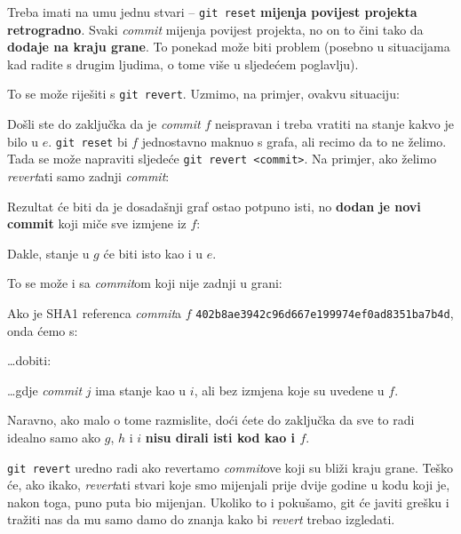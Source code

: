 Treba imati na umu jednu stvari -- \verb+git reset+ \textbf{mijenja povijest projekta retrogradno}.
Svaki \emph{commit} mijenja povijest projekta, no on to čini tako da \textbf{dodaje na kraju grane}.
To ponekad može biti problem (posebno u situacijama kad radite s drugim ljudima, o tome više u sljedećem poglavlju).

To se može riješiti s \verb+git revert+. Uzmimo, na primjer, ovakvu situaciju:



Došli ste do zaključka da je \emph{commit} $f$ neispravan i treba vratiti na stanje kakvo je bilo u $e$.
\verb+git reset+ bi $f$ jednostavno maknuo s grafa, ali recimo da to ne želimo.
Tada se može napraviti sljedeće \verb+git revert <commit>+. 
Na primjer, ako želimo \emph{revert}ati samo zadnji \emph{commit}:


Rezultat će biti da je dosadašnji graf ostao potpuno isti, no \textbf{dodan je novi commit} koji miče sve izmjene iz $f$:



Dakle, stanje u $g$ će biti isto kao i u $e$.

To se može i sa \emph{commit}om koji nije zadnji u grani:



Ako je SHA1 referenca \emph{commit}a $f$ \verb+402b8ae3942c96d667e199974ef0ad8351ba7b4d+, onda ćemo s:


\dots{}dobiti:



\dots{}gdje \emph{commit} $j$ ima stanje kao u $i$, ali bez izmjena koje su uvedene u $f$.

Naravno, ako malo o tome razmislite, doći ćete do zaključka da sve to radi idealno samo ako $g$, $h$ i $i$ \textbf{nisu dirali isti kod kao i $f$}.

\verb+git revert+ uredno radi ako revertamo \emph{commit}ove koji su bliži kraju grane.
Teško će, ako ikako, \emph{revert}ati stvari koje smo mijenjali prije dvije godine u kodu koji je, nakon toga, puno puta bio mijenjan.
Ukoliko to i pokušamo, git će javiti grešku i tražiti nas da mu samo damo do znanja kako bi \emph{revert} trebao izgledati.

